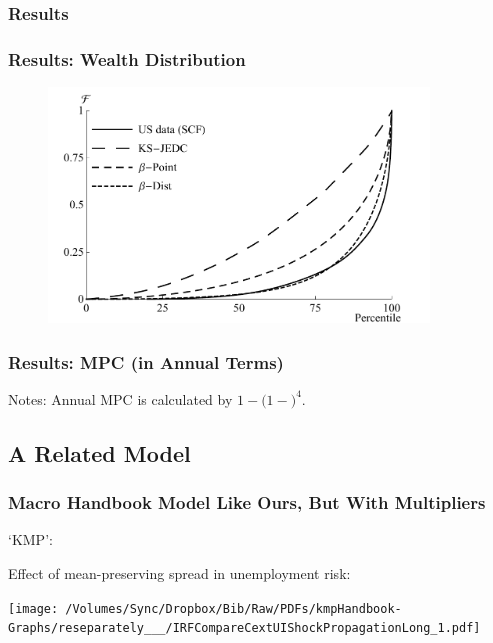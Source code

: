 \documentclass{beamer}
\begin{document}
\subsubsection{Results}
\begin{frame}
\frametitle{Results: Wealth Distribution}

\begin{figure}
\centering
\includegraphics[width=0.9\textwidth]{../Figures/LifeCycleLorenzPlot.pdf}
\label{LifeCycleLorenzPlot}
\end{figure}

\end{frame}

\begin{frame}
\frametitle{{Results: MPC (in Annual Terms)}}
\begin{tiny}
\begin{table}

\end{table}
\tiny{Notes: Annual MPC is calculated by $1-(1-$$)^{4}$.
}
\end{tiny}
\end{frame}

\subsection{A Related Model}
\begin{frame}
\frametitle{Macro Handbook Model Like Ours, But With Multipliers}

`KMP': \cite{kmpHandbook}

Effect of mean-preserving spread in unemployment risk:

\begin{center}
\texttt{[image: /Volumes/Sync/Dropbox/Bib/Raw/PDFs/kmpHandbook-Graphs/reseparately\_\_\_/IRFCompareCextUIShockPropagationLong\_1.pdf]}
\end{center}

\end{frame}
\end{document}
